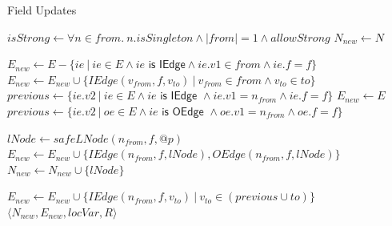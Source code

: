 \begin{algorithm}
\caption{Field Updates}\label{algo:pt:writes}
\begin{algorithmic}[1]
    \State $isStrong \gets \forall n \in from.~ n.isSingleton \land |from| = 1 \land allowStrong$
    \State $N_{new} \gets N$

        \State $E_{new} \gets E - \{ ie ~|~ ie \in E \land ie \textsf{ is IEdge} \land ie.v1 \in from \land ie.f = f\} $
        \State $E_{new} \gets E_{new} \cup \{ IEdge(v_{from}, f, v_{to}) ~|~ v_{from} \in from \land v_{to} \in to \}$
    \Else
            \State $previous \gets \{ ie.v2 ~|~ ie \in E \land ie \textsf{ is IEdge } \land ie.v1 = n_{from} \land ie.f = f \}$
            \State $E_{new} \gets E$
                \State $previous \gets \{ ie.v2 ~|~ oe \in E \land ie \textsf{ is OEdge } \land oe.v1 = n_{from} \land oe.f = f \}$
            \EndIf

                \State $lNode \gets safeLNode(n_{from}, f, @p)$
                \State $E_{new} \gets E_{new} \cup \{ IEdge(n_{from}, f, lNode), OEdge(n_{from}, f, lNode) \}$
                \State $N_{new} \gets N_{new} \cup \{ lNode \}$
            \EndIf


            \State $E_{new} \gets E_{new} \cup \{ IEdge(n_{from}, f, v_{to}) ~|~  v_{to} \in (previous \cup to) \}$
        \EndFor
    \EndIf
    \State \Return $\langle N_{new}, E_{new}, locVar, R \rangle$
\EndFunction
\end{algorithmic}
\end{algorithm}
